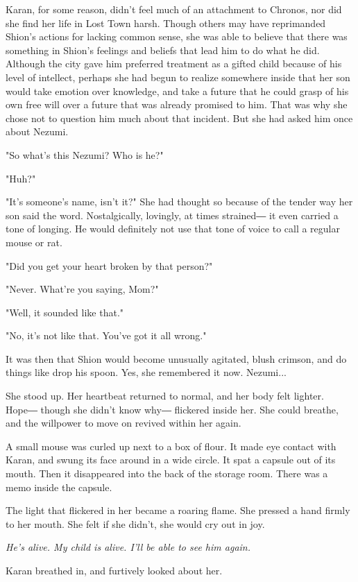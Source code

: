 Karan, for some reason, didn't feel much of an attachment to Chronos,
nor did she find her life in Lost Town harsh. Though others may have
reprimanded Shion's actions for lacking common sense, she was able to
believe that there was something in Shion's feelings and beliefs that
lead him to do what he did. Although the city gave him preferred
treatment as a gifted child because of his level of intellect, perhaps
she had begun to realize somewhere inside that her son would take
emotion over knowledge, and take a future that he could grasp of his own
free will over a future that was already promised to him. That was why
she chose not to question him much about that incident. But she had
asked him once about Nezumi.

"So what's this Nezumi? Who is he?"

"Huh?"

"It's someone's name, isn't it?" She had thought so because of the
tender way her son said the word. Nostalgically, lovingly, at times
strained― it even carried a tone of longing. He would definitely not use
that tone of voice to call a regular mouse or rat.

"Did you get your heart broken by that person?"

"Never. What're you saying, Mom?"

"Well, it sounded like that."

"No, it's not like that. You've got it all wrong."

It was then that Shion would become unusually agitated, blush crimson,
and do things like drop his spoon. Yes, she remembered it now. Nezumi...

She stood up. Her heartbeat returned to normal, and her body felt
lighter. Hope― though she didn't know why― flickered inside her. She
could breathe, and the willpower to move on revived within her again.

A small mouse was curled up next to a box of flour. It made eye contact
with Karan, and swung its face around in a wide circle. It spat a
capsule out of its mouth. Then it disappeared into the back of the
storage room. There was a memo inside the capsule.


The light that flickered in her became a roaring flame. She pressed a
hand firmly to her mouth. She felt if she didn't, she would cry out in
joy.

\emph{He's alive. My child is alive. I'll be able to see him again.}

Karan breathed in, and furtively looked about her.

